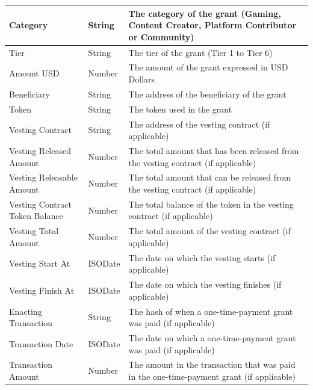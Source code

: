 \documentclass[MSE,Master,english]{twbook}%
\begin{document}
\begin{table}[H]
{\begin{tabular}{|l|l|l|}
  Category                       & String  & The category of the grant (Gaming, Content Creator, Platform Contributor or Community) \\ \hline
  Tier                           & String  & The tier of the grant (Tier 1 to Tier 6)                                               \\ \hline
  Amount USD                     & Number  & The amount of the grant expressed in USD Dollars                                       \\ \hline
  Beneficiary                    & String  & The address of the beneficiary of the grant                                            \\ \hline
  Token                          & String  & The token used in the grant                                                            \\ \hline
  Vesting Contract               & String  & The address of the vesting contract (if applicable)                                    \\ \hline
  Vesting Released Amount        & Number  & The total amount that has been released from the vesting contract (if applicable)      \\ \hline
  Vesting Releasable Amount      & Number  & The total amount that can be released from the vesting contract (if applicable)        \\ \hline
  Vesting Contract Token Balance & Number  & The total balance of the token in the vesting contract (if applicable)                 \\ \hline
  Vesting Total Amount           & Number  & The total amount of the vesting contract (if applicable)                               \\ \hline
  Vesting Start At               & ISODate & The date on which the vesting starts (if applicable)                                   \\ \hline
  Vesting Finish At              & ISODate & The date on which the vesting finishes (if applicable)                                 \\ \hline
  Enacting Transaction           & String  & The hash of when a one-time-payment grant was paid (if applicable)                     \\ \hline
  Transaction Date               & ISODate & The date on which a one-time-payment grant was paid (if applicable)                    \\ \hline
  Transaction Amount & Number & The amount in the transaction that was paid in the one-time-payment grant (if applicable) \\ \hline

\end{tabular}}
\end{table}
\end{document}
